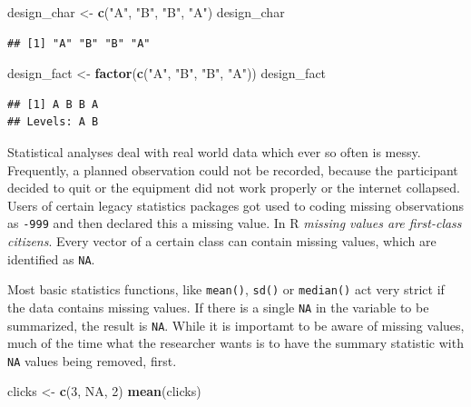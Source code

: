\documentclass[]{svmono}
\newenvironment{Shaded}{\begin{snugshade}}{\end{snugshade}}
\newcommand{\KeywordTok}[1]{\textcolor[rgb]{0.13,0.29,0.53}{\textbf{#1}}}
\newcommand{\DecValTok}[1]{\textcolor[rgb]{0.00,0.00,0.81}{#1}}
\newcommand{\StringTok}[1]{\textcolor[rgb]{0.31,0.60,0.02}{#1}}
\newcommand{\OtherTok}[1]{\textcolor[rgb]{0.56,0.35,0.01}{#1}}
\newcommand{\NormalTok}[1]{#1}
\begin{document}
\begin{Shaded}
\begin{Highlighting}[]
\NormalTok{design_char <-}\StringTok{ }\KeywordTok{c}\NormalTok{(}\StringTok{"A"}\NormalTok{, }\StringTok{"B"}\NormalTok{, }\StringTok{"B"}\NormalTok{, }\StringTok{"A"}\NormalTok{)}
\NormalTok{design_char}
\end{Highlighting}
\end{Shaded}

\begin{verbatim}
## [1] "A" "B" "B" "A"
\end{verbatim}

\begin{Shaded}
\begin{Highlighting}[]
\NormalTok{design_fact <-}\StringTok{ }\KeywordTok{factor}\NormalTok{(}\KeywordTok{c}\NormalTok{(}\StringTok{"A"}\NormalTok{, }\StringTok{"B"}\NormalTok{, }\StringTok{"B"}\NormalTok{, }\StringTok{"A"}\NormalTok{))}
\NormalTok{design_fact}
\end{Highlighting}
\end{Shaded}

\begin{verbatim}
## [1] A B B A
## Levels: A B
\end{verbatim}

Statistical analyses deal with real world data which ever so often is
messy. Frequently, a planned observation could not be recorded, because
the participant decided to quit or the equipment did not work properly
or the internet collapsed. Users of certain legacy statistics packages
got used to coding missing observations as \texttt{-999} and then
declared this a missing value. In R \emph{missing values are first-class
citizens}. Every vector of a certain class can contain missing values,
which are identified as \texttt{NA}.

Most basic statistics functions, like \texttt{mean()}, \texttt{sd()} or
\texttt{median()} act very strict if the data contains missing values.
If there is a single \texttt{NA} in the variable to be summarized, the
result is \texttt{NA}. While it is importamt to be aware of missing
values, much of the time what the researcher wants is to have the
summary statistic with \texttt{NA} values being removed, first.

\begin{Shaded}
\begin{Highlighting}[]
\NormalTok{clicks <-}\StringTok{ }\KeywordTok{c}\NormalTok{(}\DecValTok{3}\NormalTok{, }\OtherTok{NA}\NormalTok{, }\DecValTok{2}\NormalTok{)}
\KeywordTok{mean}\NormalTok{(clicks)}
\end{Highlighting}
\end{Shaded}
\end{document}
